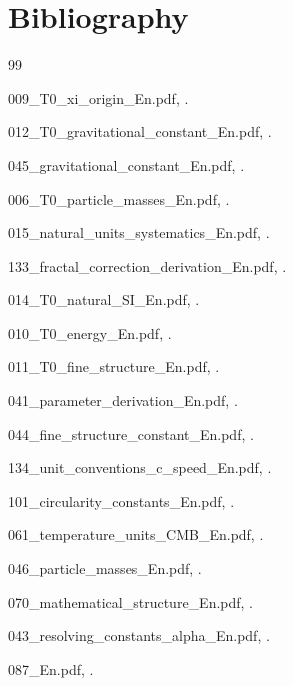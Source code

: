 	
	
	\section{Bibliography}
	
	\begin{thebibliography}{99}
		
		009\_T0\_xi\_origin\_En.pdf, .
		
		012\_T0\_gravitational\_constant\_En.pdf, .
		
		045\_gravitational\_constant\_En.pdf, .
		
		006\_T0\_particle\_masses\_En.pdf, .
		
		015\_natural\_units\_systematics\_En.pdf, .
		
		133\_fractal\_correction\_derivation\_En.pdf, .
		
		014\_T0\_natural\_SI\_En.pdf, .
		
		010\_T0\_energy\_En.pdf, .
		
		011\_T0\_fine\_structure\_En.pdf, .
		
		041\_parameter\_derivation\_En.pdf, .
		
		044\_fine\_structure\_constant\_En.pdf, .
		
		134\_unit\_conventions\_c\_speed\_En.pdf, .
		
		101\_circularity\_constants\_En.pdf, .
		
		061\_temperature\_units\_CMB\_En.pdf, .
		
		046\_particle\_masses\_En.pdf, .
		
		070\_mathematical\_structure\_En.pdf, .
		
		043\_resolving\_constants\_alpha\_En.pdf, .
		
		087\_En.pdf, .
		
	\end{thebibliography}
	